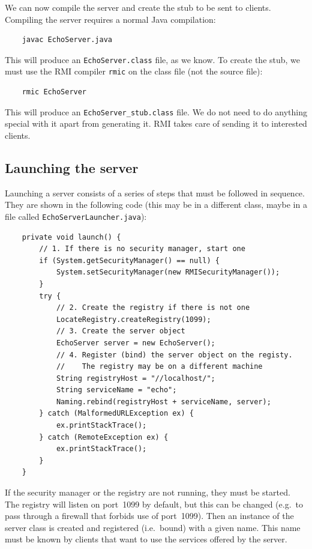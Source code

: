 We can now compile the server and create the stub to be sent to
clients. Compiling the server requires a normal Java compilation: 

\begin{verbatim}
    javac EchoServer.java
\end{verbatim}

This will produce an \verb+EchoServer.class+ file, as we know. To
create the stub, we must use the RMI compiler \verb+rmic+ 
on the class file (not the source file):

\begin{verbatim}
    rmic EchoServer
\end{verbatim}

This will produce an \verb+EchoServer_stub.class+ file. We do not need
to do anything special with it apart from generating it. RMI takes
care of sending it to interested clients. 

\subsection{Launching the server}
\label{sec:launching-server}

Launching a server consists of a series of steps that must be followed
in sequence. They are shown in the following code (this may be in a
different class, maybe in a file called \verb+EchoServerLauncher.java+): 

\begin{verbatim}
    private void launch() {
        // 1. If there is no security manager, start one
        if (System.getSecurityManager() == null) {
            System.setSecurityManager(new RMISecurityManager());
        }
        try {
            // 2. Create the registry if there is not one
            LocateRegistry.createRegistry(1099);
            // 3. Create the server object
            EchoServer server = new EchoServer();
            // 4. Register (bind) the server object on the registy. 
            //    The registry may be on a different machine
            String registryHost = "//localhost/";
            String serviceName = "echo";
            Naming.rebind(registryHost + serviceName, server);
        } catch (MalformedURLException ex) {
            ex.printStackTrace();
        } catch (RemoteException ex) {
            ex.printStackTrace();
        }
    }
\end{verbatim}

If the security manager or the registry are not running, they must be
started. The registry will listen on port~1099 by default, but this
can be changed (e.g.~to pass through a firewall that forbids use of
port~1099). Then an instance of the server class is created and
registered (i.e.~bound) with a given name. This name must be known by
clients that want to use the services offered by the server.

